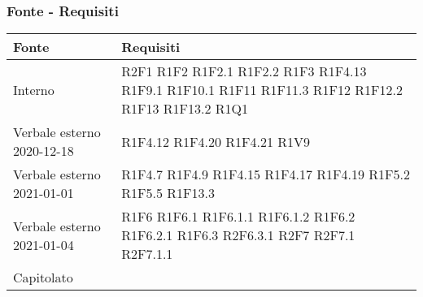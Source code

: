 \subsubsection{Fonte - Requisiti}
\begin{center}
	\begin{longtable}{|p{44mm}|p{22mm}|}
		\hline
		\rowcolor{lighter-grayer}
		\textbf{Fonte} &  \textbf{Requisiti}  \\
		\hline
		\endhead
		
		
		
		 Interno & 
		 R2F1 \newline
		 	R1F2 \newline
		 	R1F2.1 \newline
		 	R1F2.2 \newline
			R1F3 \newline 	 
			R1F4.13 \newline
			R1F9.1 \newline
			R1F10.1 \newline
			R1F11 \newline
			R1F11.3 \newline
			R1F12 \newline
			R1F12.2 \newline
			R1F13 \newline
			R1F13.2 \newline
			R1Q1
	    \\
		\hline
		Verbale esterno 2020-12-18 & 
		
			R1F4.12 \newline
			R1F4.20 \newline
			R1F4.21 \newline
			R1V9
	\\
	\hline
	Verbale esterno 2021-01-01 & 
		R1F4.7 \newline
		R1F4.9 \newline
		R1F4.15 \newline
		R1F4.17 \newline
		R1F4.19 \newline
		R1F5.2 \newline
		R1F5.5 \newline
		R1F13.3
\\
\hline
Verbale esterno 2021-01-04 & 

	R1F6 \newline
	R1F6.1 \newline
	R1F6.1.1 \newline
	R1F6.1.2 \newline
	R1F6.2 \newline
	R1F6.2.1 \newline
	R1F6.3 \newline
	R2F6.3.1 \newline
	R2F7 \newline
	R2F7.1 \newline
	R2F7.1.1
\\
\hline
Capitolato & 


\end{longtable}
\end{center}
